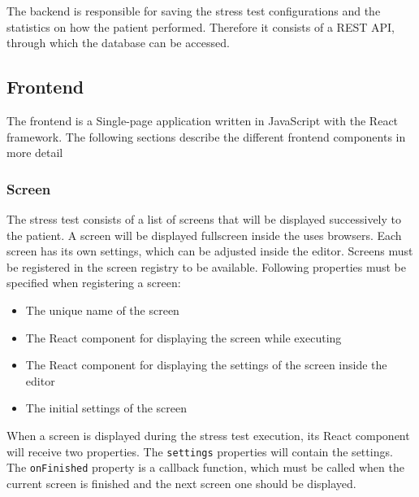 The backend is responsible for saving the stress test configurations and the statistics on how the patient performed.
Therefore it consists of a REST API, through which the database can be accessed.

\subsection{Frontend}
The frontend is a Single-page application written in JavaScript with the React framework. 
The following sections describe the different frontend components in more detail

\subsubsection{Screen}
The stress test consists of a list of screens that will be displayed successively to the patient. 
A screen will be displayed fullscreen inside the uses browsers. 
Each screen has its own settings, which can be adjusted inside the editor. 
Screens must be registered in the screen registry to be available.
Following properties must be specified when registering a screen:
\begin{itemize}
  \item The unique name of the screen
  \item The React component for displaying the screen while executing
  \item The React component for displaying the settings of the screen inside the editor
  \item The initial settings of the screen
\end{itemize}

When a screen is displayed during the stress test execution, its React component will receive two properties. 
The \texttt{settings} properties will contain the settings.
The \texttt{onFinished} property is a callback function, which must be called when the current screen is finished and the next screen one should be displayed.

